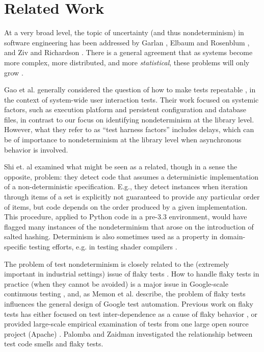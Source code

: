 \section{Related Work}

At a very broad level, the topic of uncertainty (and thus nondeterminism) in software engineering has been addressed by Garlan \cite{GarlanUncertain}, Elbaum and Rosenblum \cite{Unknowns,lu2015roundtable}, and Ziv and Richardson \cite{UncertaintyPrinciple}.  There is a general agreement that as systems become more complex, more distributed, and more \emph{statistical}, these problems will only grow \cite{lu2015roundtable}.

Gao et al. generally considered the question of how to make tests repeatable \cite{Gao:2015:MSU:2818754.2818764}, in the context of system-wide user interaction tests.  Their work focused on systemic factors, such as execution platform and persistent configuration and database files, in contrast to our focus on identifying nondeterminism at the library level.  However, what they refer to as ``test harness factors'' includes delays, which can be of importance to nondeterminism at the library level when asynchronous behavior is involved.

Shi et. al \cite{DetermImp} examined what might be seen as a related, though in a sense the opposite, problem:  they detect code that assumes a deterministic implementation of a non-deterministic specification.  E.g., they detect instances when  iteration through items of a set is explicitly not guaranteed to provide any particular order of items, but code depends on the order produced by a given implementation.  This procedure, applied to Python code in a pre-3.3 environment, would have flagged many instances of the nondeterminism that arose on the introduction of salted hashing.  Determinism is also sometimes used as a property in domain-specific testing efforts, e.g. in testing shader compilers \cite{shader}.

The problem of test nondeterminism is closely related to the (extremely important in industrial settings) issue of flaky tests \cite{miccoflaky, luo2014empirical,palomba2017does,listfieldtestanalysis}.  How to handle flaky tests in practice (when they cannot be avoided) is a major issue in Google-scale continuous testing \cite{memon2017taming}, and, as Memon et al. describe, the problem of flaky tests influences the general design of Google test automation.
Previous work on flaky tests has either focused on test inter-dependence as a cause of flaky behavior \cite{LamZE2015}, or provided large-scale empirical examination of tests from one large open source project (Apache) \cite{luo2014empirical,palomba2017does}.  Palomba and Zaidman \cite{palomba2017does} investigated the relationship between test code smells and flaky tests.

